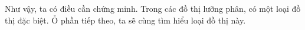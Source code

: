 \begin{multicols}{2}
	\vskip 0.1cm 
	Như vậy, ta có điều cần chứng minh.
	\vskip 0.1cm
	Trong các đồ thị lưỡng phân, có một loại đồ thị đặc biệt. Ỏ phần tiếp theo, ta sẽ cùng tìm hiểu loại đồ thị này. 
	\vskip 0.1cm

\end{multicols}
